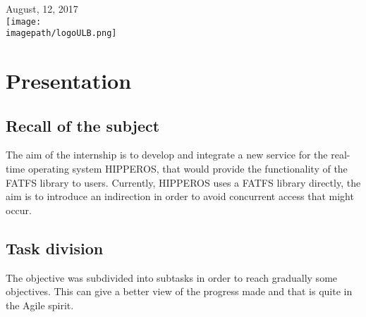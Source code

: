 \documentclass[12pt]{article}
\begin{document}
\begin{titlepage}

{\large August, 12, 2017 }\\[2cm] %



\texttt{[image: \\imagepath/logoULB.png]}\\[1cm] 
 

\vfill %

\end{titlepage}

\newpage


\pagestyle{fancy}
\fancyhf{}
\setlength\headheight{15pt}
\fancyhead[R]{}
\fancyfoot[L]{\today}
\fancyfoot[R]{\thepage}

\newpage

\tableofcontents
\newpage
\section{Presentation}
\subsection{Recall of the subject}
The aim of the internship is to develop and integrate a new service for the real-time operating system HIPPEROS, 
that would provide the functionality of the FATFS library to users.
Currently, HIPPEROS uses a FATFS library directly, the aim is to introduce an indirection in order to 
avoid concurrent access that might occur.

\subsection{Task division}
The objective was subdivided into subtasks in order to reach gradually some objectives. 
This can give a better view of the progress made and that is quite in the Agile spirit.\\
\end{document}
